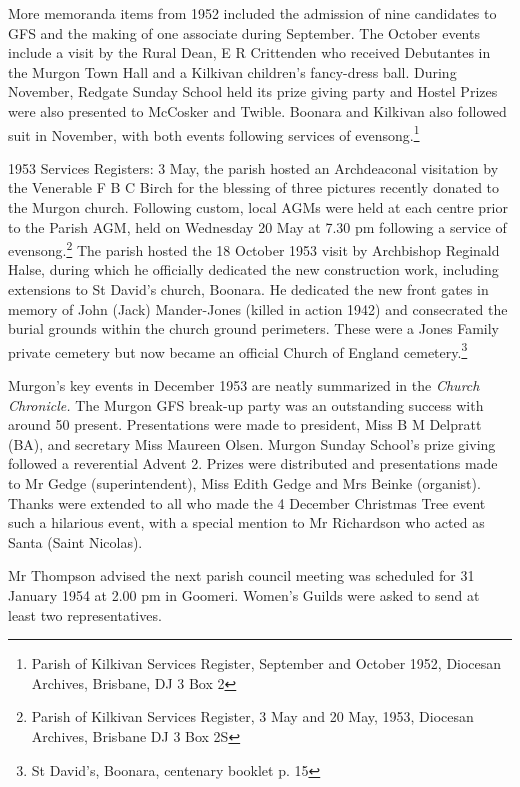More memoranda items from 1952 included the admission of nine candidates to GFS and the making of one associate during September. The October events include a visit by the Rural Dean, E R Crittenden who received Debutantes in the Murgon Town Hall and a Kilkivan children's fancy-dress ball. During November, Redgate Sunday School held its prize giving party and Hostel Prizes were also presented to McCosker and Twible. Boonara and Kilkivan also followed suit in November, with both events following services of evensong.\footnote{Parish of Kilkivan Services Register, September and October 1952, Diocesan Archives, Brisbane, DJ 3 Box 2}


1953 Services Registers: 3 May, the parish hosted an Archdeaconal visitation by the Venerable F B C Birch for the blessing of three pictures recently donated to the Murgon church. Following custom, local AGMs were held at each centre prior to the Parish AGM, held on Wednesday 20 May at 7.30 pm following a service of evensong.\footnote{Parish of Kilkivan Services Register, 3 May and 20 May, 1953, Diocesan Archives, Brisbane DJ 3 Box 2S} The parish hosted the 18 October 1953 visit by Archbishop Reginald Halse, during which he officially dedicated the new construction work, including extensions to St David's church, Boonara. He dedicated the new front gates in memory of John (Jack) Mander-Jones (killed in action 1942) and consecrated the burial grounds within the church ground perimeters. These were a Jones Family private cemetery but now became an official Church of England cemetery.\footnote{St David's, Boonara, centenary booklet p. 15}


Murgon's key events in December 1953 are neatly summarized in the \emph{Church Chronicle.} The Murgon GFS break-up party was an outstanding success with around 50 present. Presentations were made to president, Miss B M Delpratt (BA), and secretary Miss Maureen Olsen. Murgon Sunday School's prize giving followed a reverential Advent 2. Prizes were distributed and presentations made to Mr Gedge (superintendent), Miss Edith Gedge and Mrs Beinke (organist). Thanks were extended to all who made the 4 December Christmas Tree event such a hilarious event, with a special mention to Mr Richardson who acted as Santa (Saint Nicolas).



Mr Thompson advised the next parish council meeting was scheduled for 31 January 1954 at 2.00 pm in Goomeri. Women's Guilds were asked to send at least two representatives.



